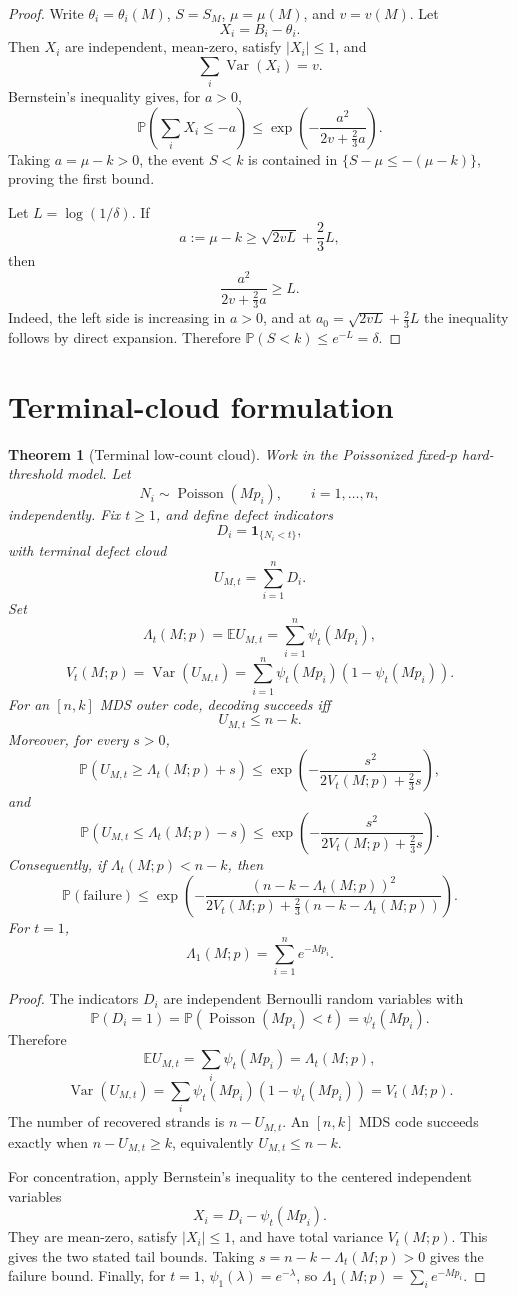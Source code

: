 \documentclass[11pt]{article}
\newtheorem{theorem}{Theorem}
\theoremstyle{definition}
\theoremstyle{remark}
\DeclareMathOperator{\Poisson}{Poisson}
\DeclareMathOperator{\Var}{Var}
\newcommand{\E}{\mathbb E}
\newcommand{\Pbb}{\mathbb P}
\newcommand{\1}{\mathbf 1}
\begin{document}
\begin{proof}
Write \(\theta_i=\theta_i(M)\), \(S=S_M\), \(\mu=\mu(M)\), and \(v=v(M)\).  Let
\[
  X_i=B_i-\theta_i.
\]
Then \(X_i\) are independent, mean-zero, satisfy \(|X_i|\le1\), and
\[
  \sum_i\Var(X_i)=v.
\]
Bernstein's inequality \cite[Chapter~2]{BoucheronLugosiMassart2013} gives, for \(a>0\),
\[
  \Pbb\left(\sum_i X_i\le -a\right)
  \le
  \exp\left(-\frac{a^2}{2v+\frac23a}\right).
\]
Taking \(a=\mu-k>0\), the event \(S<k\) is contained in \(\{S-\mu\le-(\mu-k)\}\), proving the first bound.

Let \(L=\log(1/\delta)\).  If
\[
  a:=\mu-k\ge \sqrt{2vL}+\frac23L,
\]
then
\[
  \frac{a^2}{2v+\frac23a}\ge L.
\]
Indeed, the left side is increasing in \(a>0\), and at \(a_0=\sqrt{2vL}+\frac23L\) the inequality follows by direct expansion.  Therefore \(\Pbb(S<k)\le e^{-L}=\delta\).
\end{proof}

\section{Terminal-cloud formulation}

\begin{theorem}[Terminal low-count cloud]\label{thm:terminal-cloud}
Work in the Poissonized fixed-\(p\) hard-threshold model.  Let
\[
  N_i\sim\Poisson(Mp_i),\qquad i=1,\ldots,n,
\]
independently.  Fix \(t\ge1\), and define defect indicators
\[
  D_i=\1_{\{N_i<t\}},
\]
with terminal defect cloud
\[
  U_{M,t}=\sum_{i=1}^nD_i.
\]
Set
\[
  \Lambda_t(M;p)=\E U_{M,t}
  =\sum_{i=1}^n\psi_t(Mp_i),
\]
\[
  V_t(M;p)=\Var(U_{M,t})
  =\sum_{i=1}^n\psi_t(Mp_i)(1-\psi_t(Mp_i)).
\]
For an \([n,k]\) MDS outer code, decoding succeeds iff
\[
  U_{M,t}\le n-k.
\]
Moreover, for every \(s>0\),
\[
  \Pbb(U_{M,t}\ge \Lambda_t(M;p)+s)
  \le
  \exp\left(-\frac{s^2}{2V_t(M;p)+\frac23s}\right),
\]
and
\[
  \Pbb(U_{M,t}\le \Lambda_t(M;p)-s)
  \le
  \exp\left(-\frac{s^2}{2V_t(M;p)+\frac23s}\right).
\]
Consequently, if \(\Lambda_t(M;p)<n-k\), then
\[
  \Pbb(\mathrm{failure})
  \le
  \exp\left(
  -\frac{(n-k-\Lambda_t(M;p))^2}{2V_t(M;p)+\frac23(n-k-\Lambda_t(M;p))}
  \right).
\]
For \(t=1\),
\[
  \Lambda_1(M;p)=\sum_{i=1}^n e^{-Mp_i}.
\]
\end{theorem}

\begin{proof}
The indicators \(D_i\) are independent Bernoulli random variables with
\[
  \Pbb(D_i=1)=\Pbb(\Poisson(Mp_i)<t)=\psi_t(Mp_i).
\]
Therefore
\[
  \E U_{M,t}=\sum_i\psi_t(Mp_i)=\Lambda_t(M;p),
\]
\[
  \Var(U_{M,t})=\sum_i\psi_t(Mp_i)(1-\psi_t(Mp_i))=V_t(M;p).
\]
The number of recovered strands is \(n-U_{M,t}\).  An \([n,k]\) MDS code succeeds exactly when \(n-U_{M,t}\ge k\), equivalently \(U_{M,t}\le n-k\).

For concentration, apply Bernstein's inequality to the centered independent variables
\[
  X_i=D_i-\psi_t(Mp_i).
\]
They are mean-zero, satisfy \(|X_i|\le1\), and have total variance \(V_t(M;p)\).  This gives the two stated tail bounds.  Taking \(s=n-k-\Lambda_t(M;p)>0\) gives the failure bound.  Finally, for \(t=1\), \(\psi_1(\lambda)=e^{-\lambda}\), so \(\Lambda_1(M;p)=\sum_i e^{-Mp_i}\).
\end{proof}
\end{document}
